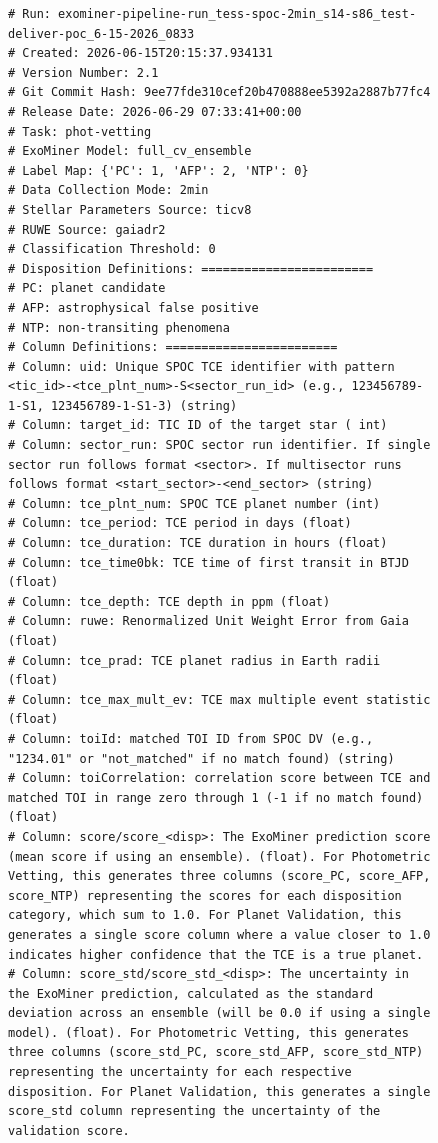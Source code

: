 \documentclass{article}
\begin{document}
\begin{figure}[htbp]
\begin{lstlisting}
# Run: exominer-pipeline-run_tess-spoc-2min_s14-s86_test-deliver-poc_6-15-2026_0833
# Created: 2026-06-15T20:15:37.934131
# Version Number: 2.1
# Git Commit Hash: 9ee77fde310cef20b470888ee5392a2887b77fc4
# Release Date: 2026-06-29 07:33:41+00:00
# Task: phot-vetting
# ExoMiner Model: full_cv_ensemble
# Label Map: {'PC': 1, 'AFP': 2, 'NTP': 0}
# Data Collection Mode: 2min
# Stellar Parameters Source: ticv8
# RUWE Source: gaiadr2
# Classification Threshold: 0
# Disposition Definitions: ========================
# PC: planet candidate
# AFP: astrophysical false positive
# NTP: non-transiting phenomena
# Column Definitions: ========================
# Column: uid: Unique SPOC TCE identifier with pattern <tic_id>-<tce_plnt_num>-S<sector_run_id> (e.g., 123456789-1-S1, 123456789-1-S1-3) (string)
# Column: target_id: TIC ID of the target star ( int)
# Column: sector_run: SPOC sector run identifier. If single sector run follows format <sector>. If multisector runs follows format <start_sector>-<end_sector> (string)
# Column: tce_plnt_num: SPOC TCE planet number (int)
# Column: tce_period: TCE period in days (float)
# Column: tce_duration: TCE duration in hours (float)
# Column: tce_time0bk: TCE time of first transit in BTJD (float)
# Column: tce_depth: TCE depth in ppm (float)
# Column: ruwe: Renormalized Unit Weight Error from Gaia (float)
# Column: tce_prad: TCE planet radius in Earth radii (float)
# Column: tce_max_mult_ev: TCE max multiple event statistic (float)
# Column: toiId: matched TOI ID from SPOC DV (e.g., "1234.01" or "not_matched" if no match found) (string)
# Column: toiCorrelation: correlation score between TCE and matched TOI in range zero through 1 (-1 if no match found) (float)
# Column: score/score_<disp>: The ExoMiner prediction score (mean score if using an ensemble). (float). For Photometric Vetting, this generates three columns (score_PC, score_AFP, score_NTP) representing the scores for each disposition category, which sum to 1.0. For Planet Validation, this generates a single score column where a value closer to 1.0 indicates higher confidence that the TCE is a true planet.
# Column: score_std/score_std_<disp>: The uncertainty in the ExoMiner prediction, calculated as the standard deviation across an ensemble (will be 0.0 if using a single model). (float). For Photometric Vetting, this generates three columns (score_std_PC, score_std_AFP, score_std_NTP) representing the uncertainty for each respective disposition. For Planet Validation, this generates a single score_std column representing the uncertainty of the validation score.

\end{lstlisting}
\end{figure}
\end{document}
